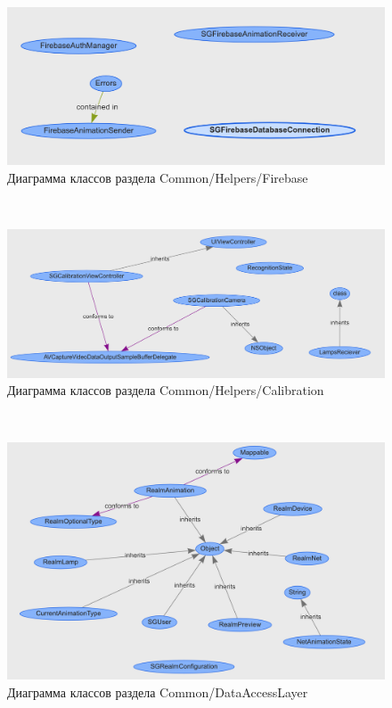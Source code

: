 ~
\begin{figure}[H]
\centering
	\includegraphics[scale=0.5]{figures/diagrams/class/firebase.png}
	\caption{Диаграмма классов раздела Common/Helpers/Firebase}
	\label{fig:appendices:classDiagram:firebase}
\end{figure}
~
\begin{figure}[H]
\centering
	\includegraphics[scale=0.5]{figures/diagrams/class/calibration.png}
	\caption{Диаграмма классов раздела Common/Helpers/Calibration}
	\label{fig:appendices:classDiagram:calibration}
\end{figure}
~
\begin{figure}[H]
\centering
	\includegraphics[scale=0.5]{figures/diagrams/class/realmData.png}
	\caption{Диаграмма классов раздела Common/DataAccessLayer}
	\label{fig:appendices:classDiagram:realmData}
\end{figure}
